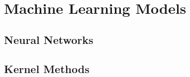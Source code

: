 \chapter{Machine Learning Models} %

\label{Chapter3} %
\setcounter{chapter}{3}

\section{Neural Networks}
\section{Kernel Methods}
